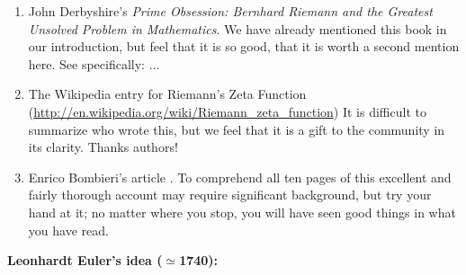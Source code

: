 \documentclass[openany]{book}
\theoremstyle{plain}
\theoremstyle{definition}
\begin{document}
 \begin{enumerate} 
 \item John Derbyshire's {\it Prime Obsession: Bernhard Riemann and
     the Greatest Unsolved Problem in Mathematics}.  We have already
   mentioned this book in our introduction, but feel that it is so
   good, that it is worth a second mention here. See specifically:
   $\dots$
 \item The Wikipedia entry for Riemann's Zeta Function
   (\url{http://en.wikipedia.org/wiki/Riemann\_zeta\_function}) It is
   difficult to summarize who wrote this, but we feel that it is a
   gift to the community in its clarity. Thanks authors!
 \item Enrico Bombieri's article .
   To comprehend all ten pages of this excellent and fairly thorough
   account may require significant background, but try your hand at
   it; no matter where you stop, you will have seen good things in
   what you have read.
\end{enumerate}
\vskip20pt
{\bf Leonhardt Euler's idea ($\simeq$1740):}
\end{document}

